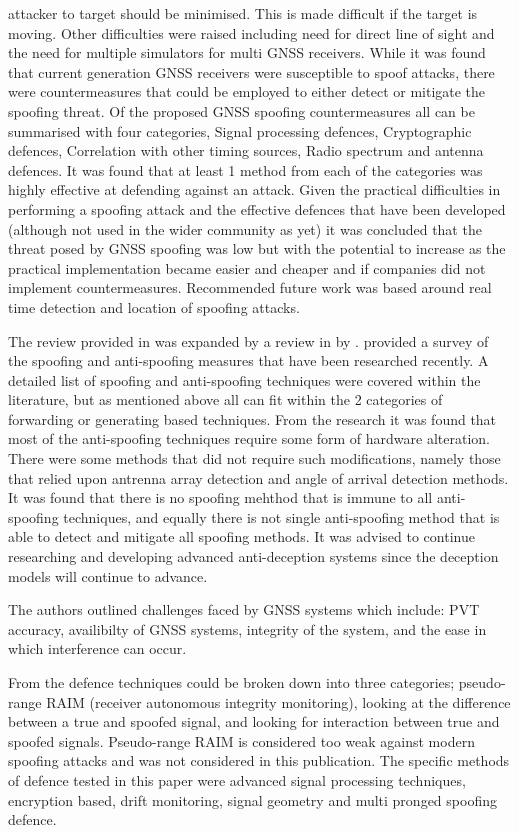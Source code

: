 attacker to target should be minimised. This is made difficult if the target is moving. Other difficulties were raised including need for direct line of sight and the need for
multiple simulators for multi GNSS receivers. 
While it was found that current generation GNSS receivers were susceptible to spoof attacks, there were countermeasures that could be employed to either detect or
mitigate the spoofing threat. Of the proposed GNSS spoofing countermeasures all can be summarised with four categories, Signal processing defences, Cryptographic
defences, Correlation with other timing sources, Radio spectrum and antenna defences. It was found that at least 1 method from each of the categories was highly effective
at defending against an attack. Given the practical difficulties in performing a spoofing attack and the effective defences that have been developed (although not used in
the wider community as yet) it was concluded that the threat posed by GNSS spoofing was low but with the potential to increase as the practical implementation became
easier and cheaper and if companies did not implement countermeasures.
Recommended future work was based around real time detection and location of spoofing attacks.

The review provided in \cite{RN32} was expanded by a review in \citeyear{RN33} by \textcite{RN33}. \citeauthor{RN33} provided a survey of the spoofing and anti-spoofing
measures that have been researched recently. A detailed list of spoofing and anti-spoofing techniques were covered within the
literature, but as mentioned above all can fit within the 2 categories of forwarding or generating based techniques. From the research it was found that most of the
anti-spoofing techniques require some form of hardware alteration. There were some methods that did not require such modifications, namely those that relied upon antrenna
array detection and angle of arrival detection methods. It was found that there is no spoofing mehthod that is immune to all anti-spoofing techniques, and equally there
is not single anti-spoofing method that is able to detect and mitigate all spoofing methods. It was advised to continue researching and developing advanced anti-deception
systems since the deception models will continue to advance. 

The authors outlined challenges faced by GNSS systems which include: PVT accuracy, availibilty of GNSS systems, integrity of the system, and the ease in which
interference can occur. 

From \cite{RN12} the defence techniques could be broken down into three categories; pseudo-range RAIM (receiver autonomous integrity monitoring),
looking at the difference between a true and spoofed signal, and looking for interaction between true and spoofed signals. Pseudo-range RAIM is considered
too weak against modern spoofing attacks and was not considered in this publication. The specific methods of defence tested in this paper  
were advanced signal processing techniques, encryption based, drift monitoring, signal geometry and multi pronged spoofing defence.

